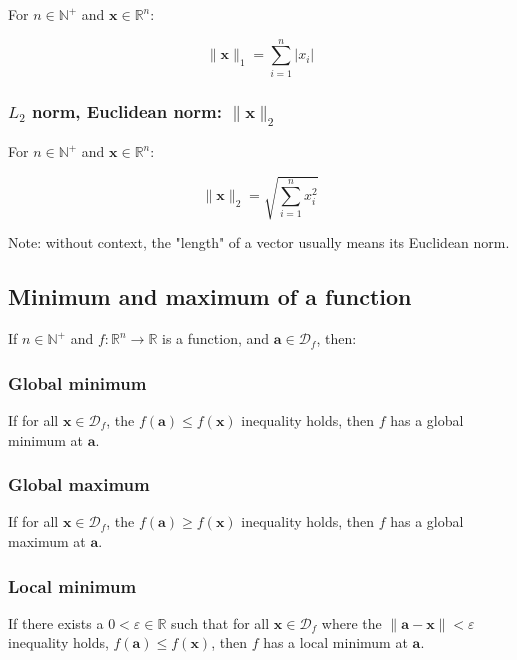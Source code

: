 \documentclass[titlepage]{article}
\begin{document}
          For $n \in \mathbb{N}^+$ and $\mathbf{x} \in \mathbb{R}^n$:

          $$\| \mathbf{x} \|_1 = \sum_{i=1}^n \left\lvert x_i \right\rvert$$

        \subsubsection{$L_2$ norm, Euclidean norm: $\| \mathbf{x} \|_2$}

          For $n \in \mathbb{N}^+$ and $\mathbf{x} \in \mathbb{R}^n$:

          $$\| \mathbf{x} \|_2 = \sqrt{ \sum_{i=1}^n x_i^2 }$$

          Note: without context, the "length" of a vector usually means its
          Euclidean norm.

      \subsection{Minimum and maximum of a function}

        If $n \in \mathbb{N}^+$ and $f : \mathbb{R}^n \rightarrow \mathbb{R}$ is
        a function, and $\mathbf{a} \in \mathcal{D}_f$, then:

        \subsubsection{Global minimum}

          If for all $\mathbf{x} \in \mathcal{D}_f$, the
          $f(\mathbf{a}) \leq f(\mathbf{x})$ inequality holds, then $f$ has a
          global minimum at $\mathbf{a}$.

        \subsubsection{Global maximum}

          If for all $\mathbf{x} \in \mathcal{D}_f$, the
          $f(\mathbf{a}) \geq f(\mathbf{x})$ inequality holds, then $f$ has a
          global maximum at $\mathbf{a}$.

        \subsubsection{Local minimum}

          If there exists a $0 < \varepsilon \in \mathbb{R}$ such that for all
          $\mathbf{x} \in \mathcal{D}_f$ where the
          $\| \mathbf{a} - \mathbf{x} \| < \varepsilon$ inequality holds,
          $f(\mathbf{a}) \leq f(\mathbf{x})$, then $f$ has a local minimum at
          $\mathbf{a}$.
\end{document}
